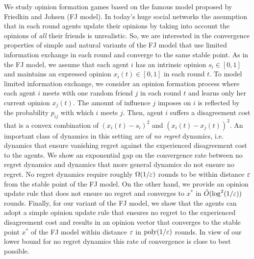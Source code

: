We study opinion formation games based on the famous model proposed by Friedkin
and Johsen (FJ model). In today's huge social networks the assumption that in
each round agents update their opinions by taking into account the opinions of
\emph{all} their friends is unrealistic. So, we are interested in the convergence
properties of simple and natural variants of the FJ model that use limited
information exchange in each round and converge to the same stable point.
%
As in the FJ model, we assume that each agent $i$ has an intrinsic opinion $s_i
\in [0,1]$ and maintains an expressed opinion $x_i(t) \in [0,1]$ in each round
$t$. To model limited information exchange, we consider an opinion formation
process where each agent $i$ meets with  one random friend $j$ in each round
$t$ and learns only her current opinion $x_j(t)$. The amount of influence $j$
imposes on $i$ is reflected by the probability $p_{ij}$ with which $i$ meets
$j$. Then, agent $i$ suffers a disagreement cost that is a convex combination
of $(x_i(t) - s_i)^2$ and $(x_i(t) - x_j(t))^2$.
%
An important class of dynamics in this setting are of \emph{no regret} dynamics,
i.e. dynamics that ensure vanishing regret against the experienced
disagreement cost to the agents.  We show an exponential gap on
the convergence rate between no regret dynamics and dynamics that more general
dynamics do not ensure no regret.  No regret dynamics require roughly
$\Omega(1/\varepsilon)$ rounds to be within distance $\varepsilon$ from the stable point of
the FJ model.  On the other hand, we provide an opinion update rule that does
not ensure no regret and converges to
$x^\ast$ in $\tilde{O}(\log^2(1/\varepsilon))$ rounds.  Finally, for our variant
of the FJ model, we show that the agents can adopt a simple opinion update rule
that ensures no regret to the experienced disagreement cost and results in an
opinion vector that converges to the stable point $x^\ast$ of the FJ model
within distance $\varepsilon$ in $\mathrm{poly}(1/\varepsilon)$ rounds. In view of our
lower bound for no regret dynamics this rate of convergence is close to best
possible.
